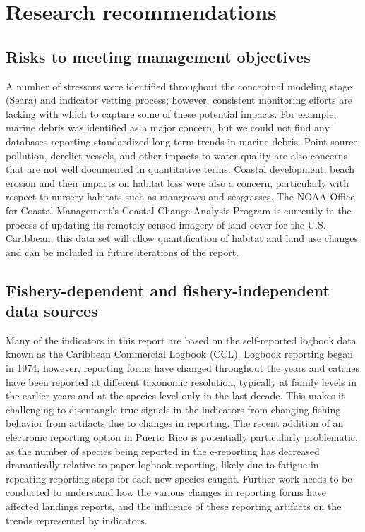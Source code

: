 \documentclass[
  letterpaper,
  oneside,
  open=any]{scrbook}
\begin{document}

\chapter{Research recommendations}\label{research-recommendations}

\section{Risks to meeting management
objectives}\label{risks-to-meeting-management-objectives}

A number of stressors were identified throughout the conceptual modeling
stage (Seara) and indicator vetting process; however, consistent
monitoring efforts are lacking with which to capture some of these
potential impacts. For example, marine debris was identified as a major
concern, but we could not find any databases reporting standardized
long-term trends in marine debris. Point source pollution, derelict
vessels, and other impacts to water quality are also concerns that are
not well documented in quantitative terms. Coastal development, beach
erosion and their impacts on habitat loss were also a concern,
particularly with respect to nursery habitats such as mangroves and
seagrasses. The NOAA Office for Coastal Management's Coastal Change
Analysis Program is currently in the process of updating its
remotely-sensed imagery of land cover for the U.S. Caribbean; this data
set will allow quantification of habitat and land use changes and can be
included in future iterations of the report.

\section{Fishery-dependent and fishery-independent data
sources}\label{fishery-dependent-and-fishery-independent-data-sources}

Many of the indicators in this report are based on the self-reported
logbook data known as the Caribbean Commercial Logbook (CCL). Logbook
reporting began in 1974; however, reporting forms have changed
throughout the years and catches have been reported at different
taxonomic resolution, typically at family levels in the earlier years
and at the species level only in the last decade. This makes it
challenging to disentangle true signals in the indicators from changing
fishing behavior from artifacts due to changes in reporting. The recent
addition of an electronic reporting option in Puerto Rico is potentially
particularly problematic, as the number of species being reported in the
e-reporting has decreased dramatically relative to paper logbook
reporting, likely due to fatigue in repeating reporting steps for each
new species caught. Further work needs to be conducted to understand how
the various changes in reporting forms have affected landings reports,
and the influence of these reporting artifacts on the trends represented
by indicators.
\end{document}

